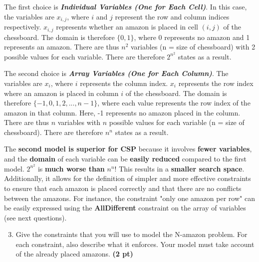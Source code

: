 \documentclass[11pt,a4paper]{report}
\begin{document}
\begin{answers}[6cm]

\footnotesize{
The first choice is \textbf{\textit{Individual Variables (One for Each Cell)}}. In this case, the variables are $x_{i,j}$, where $i$ and $j$ represent the row and column indices respectively. $x_{i,j}$ represents whether an amazon is placed in cell $(i,j)$ of the chessboard. The domain is therefore $\{0, 1\}$, where 0 represents no amazon and 1 represents an amazon. There are thus $n^2$ variables (n = size of chessboard) with 2 possible values for each variable. There are therefore $2^{n^2}$ states as a result.

The second choice is \textbf{\textit{Array Variables (One for Each Column)}}. The variables are $x_i$, where $i$ represents the column index. $x_i$ represents the row index where an amazon is placed in column $i$ of the chessboard. The domain is therefore $\{-1, 0, 1, 2, ..., n - 1\}$, where each value represents the row index of the amazon in that column. Here, -1 represents no amazon placed in the column. There are thus $n$ variables with $n$ possible values for each variable (n = size of chessboard). There are therefore $n^n$ states as a result.

The \textbf{second model is superior for CSP} because it involves \textbf{fewer variables}, and the \textbf{domain} of each variable can be \textbf{easily reduced} compared to the first model. $2^{n^2}$ is \textbf{much worse than} $n^n$! This results in a \textbf{smaller search space}. Additionally, it allows for the definition of simpler and more effective constraints to ensure that each amazon is placed correctly and that there are no conflicts between the amazons. For instance, the constraint "only one amazon per row" can be easily expressed using the \textbf{AllDifferent} constraint on the array of variables (see next questions).
}

\end{answers}

\begin{enumerate}
	\setcounter{enumi}{2}
	\item  Give the constraints that you will use to model the N-amazon problem.
	For each constraint, also describe what it enforces.
	Your model must take account of the already placed amazons. \textbf{(2 pt)}

\end{enumerate}
\end{document}
